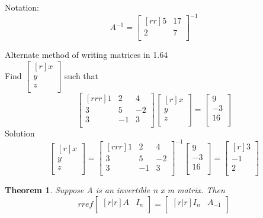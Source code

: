 \documentclass{report}
\theoremstyle{plain}
\newtheorem*{thrm}{Theorem}
\theoremstyle{definition}
\theoremstyle{plain}
\begin{document}
Notation:
\[ 
A^{-1} = \begin{bmatrix}[rr]
5 & 17\\
2 & 7\\
\end{bmatrix} ^{-1}
\]

Alternate method of writing matrices in 1.64\\
Find $\begin{bmatrix}[r] x\\ y\\ z\\ \end{bmatrix}$ such that
\[
\begin{bmatrix}[rrr] 1 & 2 & 4\\ 3 & 5 & -2\\ 3 & -1 & 3\\ \end{bmatrix}
\begin{bmatrix}[r] x\\ y\\ z\\ \end{bmatrix}
=
\begin{bmatrix} 9\\ -3\\ 16\\ \end{bmatrix}
\]
Solution
\[
\begin{bmatrix}[r] x\\ y\\ z\\ \end{bmatrix}
=
\begin{bmatrix}[rrr] 1 & 2 & 4\\ 3 & 5 & -2\\ 3 & -1 & 3\\ \end{bmatrix}^{-1}
\begin{bmatrix} 9\\ -3\\ 16\\ \end{bmatrix}
=
\begin{bmatrix}[r] 3\\ -1\\ 2\\ \end{bmatrix}
\]

\begin{thrm} Suppose A is an invertible n x m matrix. Then
\[ rref\begin{bmatrix}[r|r] A & I_n\\ \end{bmatrix}
=
\begin{bmatrix}[r|r] I_n & A_{-1}\\ \end{bmatrix}
\]
\end{thrm}
\end{document}
